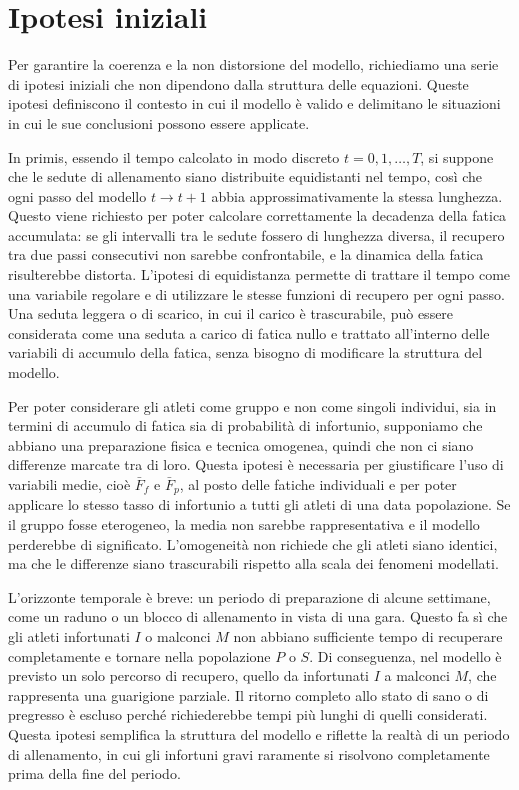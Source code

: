 \section{Ipotesi iniziali}

Per garantire la coerenza e la non distorsione del modello, richiediamo una serie di ipotesi iniziali che non dipendono dalla struttura delle equazioni. Queste ipotesi definiscono il contesto in cui il modello è valido e delimitano le situazioni in cui le sue conclusioni possono essere applicate. \par

In primis, essendo il tempo calcolato in modo discreto $t = 0, 1, \dots, T$, si suppone che le sedute di allenamento siano distribuite equidistanti nel tempo, così che ogni passo del modello $t \to t+1$ abbia approssimativamente la stessa lunghezza. Questo viene richiesto per poter calcolare correttamente la decadenza della fatica accumulata: se gli intervalli tra le sedute fossero di lunghezza diversa, il recupero tra due passi consecutivi non sarebbe confrontabile, e la dinamica della fatica risulterebbe distorta. L'ipotesi di equidistanza permette di trattare il tempo come una variabile regolare e di utilizzare le stesse funzioni di recupero per ogni passo. Una seduta leggera o di scarico, in cui il carico è trascurabile, può essere considerata come una seduta a carico di fatica nullo e trattato all'interno delle variabili di accumulo della fatica, senza bisogno di modificare la struttura del modello. \par

Per poter considerare gli atleti come gruppo e non come singoli individui, sia in termini di accumulo di fatica sia di probabilità di infortunio, supponiamo che abbiano una preparazione fisica e tecnica omogenea, quindi che non ci siano differenze marcate tra di loro. Questa ipotesi è necessaria per giustificare l'uso di variabili medie, cioè $\bar{F}_f$ e $\bar{F}_p$, al posto delle fatiche individuali e per poter applicare lo stesso tasso di infortunio a tutti gli atleti di una data popolazione. Se il gruppo fosse eterogeneo, la media non sarebbe rappresentativa e il modello perderebbe di significato. L'omogeneità non richiede che gli atleti siano identici, ma che le differenze siano trascurabili rispetto alla scala dei fenomeni modellati. \par

L'orizzonte temporale è breve: un periodo di preparazione di alcune settimane, come un raduno o un blocco di allenamento in vista di una gara. Questo fa sì che gli atleti infortunati $I$ o malconci $M$ non abbiano sufficiente tempo di recuperare completamente e tornare nella popolazione $P$ o $S$. Di conseguenza, nel modello è previsto un solo percorso di recupero, quello da infortunati $I$ a malconci $M$, che rappresenta una guarigione parziale. Il ritorno completo allo stato di sano o di pregresso è escluso perché richiederebbe tempi più lunghi di quelli considerati. Questa ipotesi semplifica la struttura del modello e riflette la realtà di un periodo di allenamento, in cui gli infortuni gravi raramente si risolvono completamente prima della fine del periodo. \par

